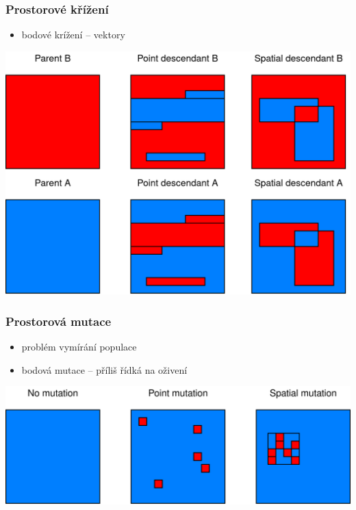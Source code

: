 \documentclass[10pt,xcolor=pdflatex,hyperref={unicode}]{beamer}
\begin{document}
\begin{frame}
\frametitle{Prostorové křížení}
\doublespacing
\begin{itemize}
    \item bodové krížení -- vektory
\end{itemize}
\hspace{0.2cm}
\includegraphics[width=0.8\paperwidth]{img/cross.png}
\end{frame}

\begin{frame}
\frametitle{Prostorová mutace}
\doublespacing
\begin{itemize}
    \item problém vymírání populace
    \item bodová mutace -- příliš řídká na oživení
\end{itemize}
\vspace{1cm}
\hspace{0.2cm}
\includegraphics[width=0.8\paperwidth]{img/mutation.png}
\end{frame}
\end{document}
